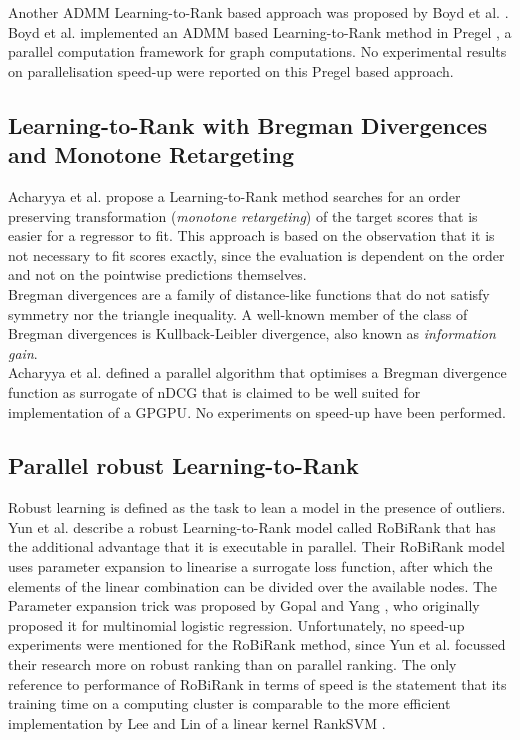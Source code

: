 Another \ac{ADMM} Learning-to-Rank based approach was proposed by Boyd et al. \cite{Boyd2012}. Boyd et al. \cite{Boyd2012} implemented an \ac{ADMM} based Learning-to-Rank method in Pregel \cite{Malewicz2010}, a parallel computation framework for graph computations. No experimental results on parallelisation speed-up were reported on this Pregel based approach.
\subsection{Learning-to-Rank with Bregman Divergences and Monotone Retargeting}
Acharyya et al. \cite{Acharyya2012} propose a Learning-to-Rank method searches for an order preserving transformation (\emph{monotone retargeting}) of the target scores that is easier for a regressor to fit. This approach is based on the observation that it is not necessary to fit scores exactly, since the evaluation is dependent on the order and not on the pointwise predictions themselves.\\

Bregman divergences are a family of distance-like functions that do not satisfy symmetry nor the triangle inequality. A well-known member of the class of Bregman divergences is Kullback-Leibler divergence, also known as \emph{information gain}.\\

Acharyya et al. \cite{Acharyya2012} defined a parallel algorithm that optimises a Bregman divergence function as surrogate of \ac{nDCG} that is claimed to be well suited for implementation of a \ac{GPGPU}. No experiments on speed-up have been performed.
\subsection{Parallel robust Learning-to-Rank}
Robust learning \cite{Huber1981} is defined as the task to lean a model in the presence of outliers. Yun et al. describe a \cite{Yun2014} robust Learning-to-Rank model called RoBiRank that has the additional advantage that it is executable in parallel. Their RoBiRank model uses parameter expansion to linearise a surrogate loss function, after which the elements of the linear combination can be divided over the available nodes. The Parameter expansion trick was proposed by Gopal and Yang \cite{Gopal2013}, who originally proposed it for multinomial logistic regression. Unfortunately, no speed-up experiments were mentioned for the RoBiRank method, since Yun et al. focussed their research more on robust ranking than on parallel ranking. The only reference to performance of RoBiRank in terms of speed is the statement that its training time on a computing cluster is comparable to the more efficient implementation by Lee and Lin \cite{Lee2014} of a linear kernel RankSVM \cite{Herbrich1999, Joachims2002}.\\

